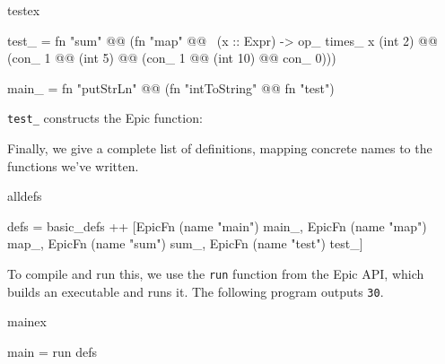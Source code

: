 \begin{SaveVerbatim}{testex}

test_ = fn "sum" @@ 
       (fn "map" @@ \ (x :: Expr) -> op_ times_ x (int 2) 
                 @@ (con_ 1 @@ (int 5) @@
                    (con_ 1 @@ (int 10) @@ con_ 0)))

main_ = fn "putStrLn" @@ (fn "intToString" @@ fn "test")

\end{SaveVerbatim}

\texttt{test\_} constructs the Epic function:


Finally, we give a complete list of definitions, mapping concrete
names to the functions we've written.

\begin{SaveVerbatim}{alldefs}

defs = basic_defs ++ [EpicFn (name "main") main_, 
                      EpicFn (name "map") map_,
                      EpicFn (name "sum") sum_,
                      EpicFn (name "test") test_]

\end{SaveVerbatim}

To compile and run this, we use the \texttt{run} function from the
Epic API, which builds an executable and runs it. The following
program outputs \texttt{30}.

\begin{SaveVerbatim}{mainex}

main = run defs

\end{SaveVerbatim}
